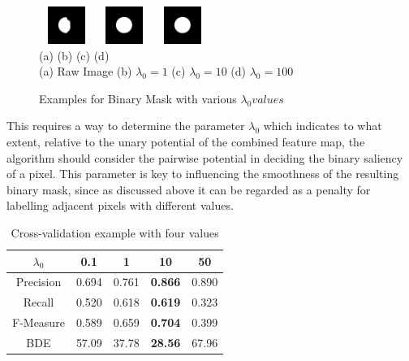 \documentclass[10pt,twocolumn,letterpaper]{article}
\newcommand{\hs}{\hspace{0.58in}}
\newcommand{\BOLD}{\textbf}
\begin{document}
\begin{figure}[t]
\begin{center}
    \includegraphics[width=0.7in,height=0.48in]{./Figures/Lambda/5_154_154732_2.jpg}
    \includegraphics[width=0.7in,height=0.48in]{./Figures/Lambda/5_154_154732_3.jpg} 
    \includegraphics[width=0.7in,height=0.48in]{./Figures/Lambda/5_154_154732_4.jpg} \\
    \footnotesize \hspace{0.1cm} (a) \hs (b) \hs  (c) \hs (d) \\
    \footnotesize  (a) Raw Image (b) $\lambda_0 = 1$  (c) $\lambda_0 = 10$ (d) $\lambda_0 =100$ \\
     \caption{Examples for Binary Mask with various $\lambda_0 values$}
\end{center}
\end{figure}


This requires a way to determine the parameter $\lambda_0$ which indicates to what extent, relative to the unary potential of the combined feature map, the algorithm should consider the pairwise potential in deciding the binary saliency of a pixel.  This parameter is key to influencing the smoothness of the resulting binary mask, since as discussed above it can be regarded as a penalty for labelling adjacent pixels with different values.

\begin{table}[h]
\begin{center}
\begin{tabular}{|c||c|c|c|c|}
    \hline
    $\lambda_0$ & 0.1 & 1   & \BOLD{10} & 50 \\ \hline
    Precision   & 0.694 & 0.761 & \BOLD{0.866} & 0.890 \\
    Recall      & 0.520 & 0.618 & \BOLD{0.619} & 0.323 \\
    F-Measure   & 0.589 & 0.659 & \BOLD{0.704} & 0.399 \\
    BDE         & 57.09 & 37.78 & \BOLD{28.56} & 67.96 \\ \hline
\end{tabular}

\caption{Cross-validation example with four values}
\end{center}
\end{table}
\end{document}
